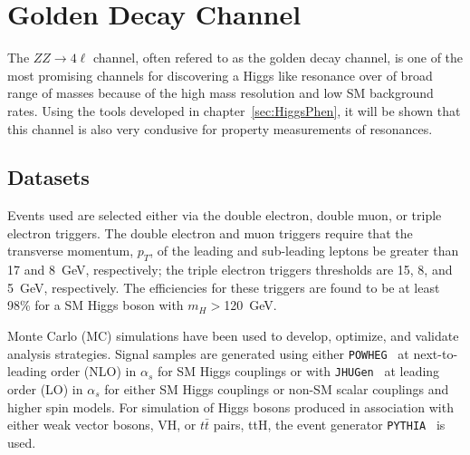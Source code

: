 \def\cm{\hbox{$\;\hbox{\rm cm}$}}
\def\eV{\hbox{$\;\hbox{\rm eV}$}}
\def\GeV{\hbox{$\;\hbox{\rm GeV}$}}
\def\MeV{\hbox{$\;\hbox{\rm MeV}$}}
\def\TeV{\hbox{$\;\hbox{\rm TeV}$}}
\def\ifb{\hbox{$fb^{-1}\rm$}}

\def\POWHEG{{\it POWHEG}}
\def\JHUGen{{\it JHUGen}}
\def\MCFM{{\it MCFM}}
\def\PYTHIA{{\it PYTHIA}}
\def\MADGRAPH{{\it MADGRAPH}}
\def\GEANTfour{{\it GEANT4}}

\newcommand{\KD}{$\mathscr{D}^{\rm kin}_{\rm bkg}$}
\newcommand{\superKD}{$\mathscr{D}_{\rm bkg}$}
\newcommand{\spinKD}{$\mathscr{D}_{J^P}$}
\newcommand{\Djet}{$\mathscr{D}_{\rm jet}$}
\newcommand{\pt}{$p_{T}$}
\newcommand{\sip}{$SIP_{3D}$}
\newcommand{\isocomb}{$ISO_{comb}$}


\section{Golden Decay Channel}
\label{sec:HZZ4l}
The $ZZ\to 4\ell$ channel, often refered to as the golden decay 
channel, is one of the most promising channels for discovering a 
Higgs like resonance over of broad range of masses because of 
the high mass resolution and low SM background rates.
Using the tools developed in chapter~\ref{sec:HiggsPhen}, it will 
be shown that this channel is also very condusive for property
measurements of resonances.

\subsection{Datasets}
\label{sec:HZZ4ldatasets}

Events used are selected either via the
double electron, double muon, or triple electron triggers.  The
double electron and muon triggers require that the transverse
momentum, $p_T$, of the leading and sub-leading leptons be 
greater than 17 and 8~GeV, respectively; the triple electron 
triggers thresholds are 15, 8, and 5~GeV, respectively.  
The efficiencies for these triggers are found to be at least 98\% 
for a SM Higgs boson with $m_H>$120~GeV.  

Monte Carlo (MC) simulations have been used to develop, optimize, 
and validate analysis strategies.  Signal samples
are generated using either \verb+POWHEG+~\cite{Frixione:2007vw} at next-to-leading 
order (NLO) in $\alpha_s$ for SM Higgs couplings or with 
\verb+JHUGen+~\cite{Gao:2010qx,Bolognesi:2012mm} at leading order 
(LO) in $\alpha_s$ for either
SM Higgs couplings or non-SM scalar couplings and higher spin
models.  For simulation of Higgs bosons produced in association
with either weak vector bosons, VH, or $t\bar{t}$ pairs, ttH, 
the event generator \verb+PYTHIA+~\cite{Sjostrand:2006za} is used.  

